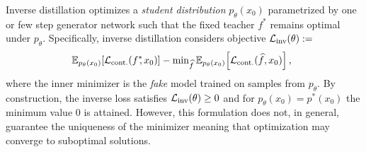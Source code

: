 
  Inverse distillation optimizes a \emph{student distribution} $p_\theta(x_0)$ parametrized by one or few step generator network such that the fixed teacher $f^*$ remains optimal under $p_\theta$. Specifically, inverse distillation considers objective $\mathcal{L}_{\text{inv}}(\theta) :=$
  \begin{gather}
    \!\!\! \mathbb{E}_{p_{\theta}(x_0)} \!\left[\mathcal{L}_{\text{cont.}}(f^*\!\!, x_0)\right]  - \min\nolimits_{\widehat{f}} \mathbb{E}_{p_{\theta}(x_0)} \! \left[\mathcal{L}_{\text{cont.}}(\widehat{f}, x_0)\right],
  \label{eq:inverse optimization problem} 
  \end{gather}
  where the inner minimizer is the \emph{fake} model trained on samples from $p_\theta$. 
  By construction, the inverse loss satisfies $\mathcal{L}_{\text{inv}}(\theta) \geq 0$ and for $p_\theta(x_0) = p^*(x_0)$ the minimum value $0$ is attained. However, this formulation does not, in general, guarantee the uniqueness of the minimizer meaning that optimization may converge to suboptimal solutions.

